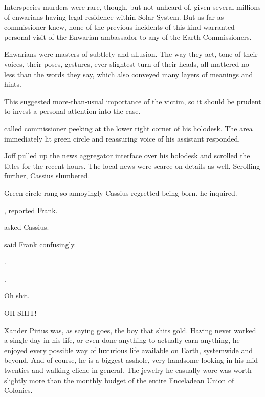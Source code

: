 Interspecies murders were rare, though, but not unheard of, given several millions of enwarians having legal residence within Solar System. But as far as commissioner knew, none of the previous incidents of this kind warranted personal visit of the Enwarian ambassador to any of the Earth Commissioners.

Enwarians were masters of subtlety and allusion. The way they act, tone of their voices, their poses, gestures, ever slightest turn of their heads, all mattered no less than the words they say, which also conveyed many layers of meanings and hints.

This suggested more-than-usual importance of the victim, so it should be prudent to invest a personal attention into the case.

 called commissioner peeking at the lower right corner of his holodesk. The area immediately lit green circle and reassuring voice of his assistant responded, 



Joff pulled up the news aggregator interface over his holodesk and scrolled the titles for the recent hours. The local news were scarce on details as well. Scrolling further, Cassius slumbered.

Green circle rang so annoyingly Cassius regretted being born.  he inquired.

, reported Frank.

 asked Cassius.

 said Frank confusingly.

.

.

Oh shit.


OH SHIT!

Xander Pirius was, as saying goes, the boy that shits gold. Having never worked a single day in his life, or even done anything to actually earn anything, he enjoyed every possible way of luxurious life available on Earth, systemwide and beyond. And of course, he is a biggest asshole, very handsome looking in his mid-twenties and walking cliche in general. The jewelry he casually wore was worth slightly more than the monthly budget of the entire Enceladean Union of Colonies.

